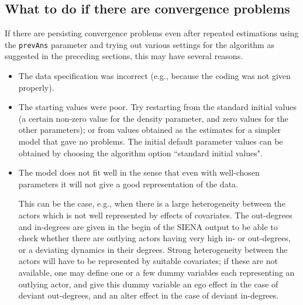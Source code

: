 \documentclass[a4paper,fleqn,11pt]{article}
\newcommand{\+}{\, + \,}
\newcommand{\SI}{{\sf SIENA }}
\begin{document}
\subsection{What to do if there are convergence problems}
\label{S_conv}

If there are persisting convergence problems even after repeated estimations
using the \texttt{prevAns} parameter and trying out various
settings for the algorithm as suggested in the preceding sections,
this may have several reasons.
\begin{itemize}
\item The data specification was incorrect (e.g., because the coding
      was not given properly).
\item The starting values were poor.
      Try restarting from the standard initial values
      (a certain non-zero value for the
      density parameter, and zero values for the other parameters);
      or from values obtained as the estimates for a simpler model
      that gave no problems.
      The initial default parameter values can be obtained
      by choosing the algorithm option ``standard initial values".

\item The model does not fit well in the sense that even with well-chosen
      parameters it will not give a good representation of the data.

      This can be the case, e.g., when there is a large heterogeneity
      between the actors which is not well represented by effects
      of covariates.
      The out-degrees and in-degrees are given in the begin of the \SI output
      to be able to check whether there are outlying actors having very high
      in- or out-degrees, or a deviating dynamics in their degrees.
      Strong heterogeneity between the actors will have to be
      represented by suitable covariates; if these are not available,
      one may define one or a few dummy variables each representing
      an outlying actor, and give this dummy variable an ego effect
      in the case of deviant out-degrees, and an alter effect in the
      case of deviant in-degrees.


\end{itemize}
\end{document}
